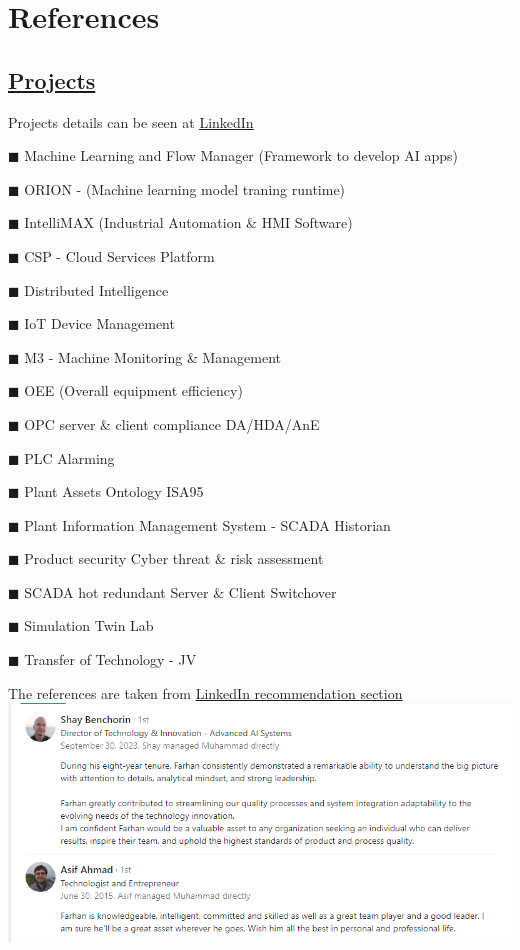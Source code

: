 \documentclass[]{cv-class}
\begin{document}
\section{References}
\begin{aside}
    \section{\underline{Projects}}
    Projects details can be seen at \underline{\href{https://www.linkedin.com/in/engr-farhan/details/projects/}{LinkedIn}}
    \vspace{2mm}
        \item $\blacksquare$ Machine Learning and Flow Manager (Framework to develop AI apps)
        \item $\blacksquare$ ORION - (Machine learning model traning runtime)
        \item $\blacksquare$ IntelliMAX (Industrial Automation \& HMI Software)
        \item $\blacksquare$ CSP - Cloud Services Platform
        \item $\blacksquare$ Distributed Intelligence
        \item $\blacksquare$ IoT Device Management
        \item $\blacksquare$ M3 - Machine Monitoring \& Management
        \item $\blacksquare$ OEE (Overall equipment efficiency)
        \item $\blacksquare$ OPC server \& client compliance DA/HDA/AnE
        \item $\blacksquare$ PLC Alarming
        \item $\blacksquare$ Plant Assets Ontology ISA95
        \item $\blacksquare$ Plant Information Management System - SCADA Historian
        \item $\blacksquare$ Product security Cyber threat \& risk assessment
        \item $\blacksquare$ SCADA hot redundant Server \& Client Switchover
        \item $\blacksquare$ Simulation Twin Lab
        \item $\blacksquare$ Transfer of Technology - JV
    \end{aside}
\begin{entrylist}
The references are taken from \underline{\href{https://www.linkedin.com/in/engr-farhan/details/recommendations/}{LinkedIn recommendation section}}\\
\includegraphics[scale=0.5]{Testimonials.png}
\end{entrylist}
\end{document}

